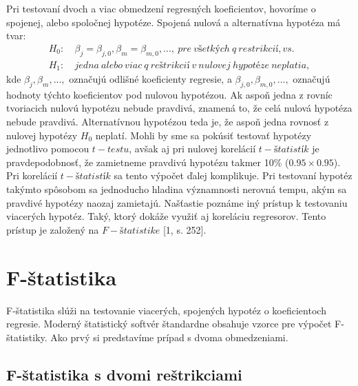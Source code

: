 \documentclass[]{tukediphc}
\begin{document}
Pri testovaní dvoch a viac obmedzení regresných koeficientov, hovoríme o spojenej, alebo spoločnej hypotéze. Spojená nulová a alternatívna hypotéza má tvar:
\begin{equation}
\begin{split}
     H_{0}: & \ \beta_j = \beta_{j,0}, \beta_m = \beta_{m,0}, ..., \ pre \ všetkých \ q \ restrikcií, vs. \ \\ H_{1}: & \ jedna \ alebo \ viac \ q \ reštrikcií \ v \ nulovej \ hypotéze \ neplatia,
\end{split}
\end{equation}
kde $\beta_j, \beta_m, ...,$ označujú odlišné koeficienty regresie, a $\beta_{j,0}, \beta_{m,0}, ...,$ označujú hodnoty týchto koeficientov pod nulovou hypotézou. Ak aspoň jedna z rovníc tvoriacich nulovú hypotézu nebude pravdivá, znamená to, že celá nulová hypotéza nebude pravdivá. Alternatívnou hypotézou teda je, že aspoň jedna rovnosť z nulovej hypotézy $H_{0}$ neplatí. 
Mohli by sme sa pokúsiť testovať hypotézy jednotlivo pomocou $t-testu$, avšak aj pri nulovej korelácií $t-štatistík$ je pravdepodobnosť, že zamietneme pravdivú hypotézu takmer 10\% ($0.95 \times 0.95$). Pri korelácií $t-štatistík$ sa tento výpočet ďalej komplikuje. Pri testovaní hypotéz takýmto spôsobom sa jednoducho hladina významnosti nerovná tempu, akým sa pravdivé hypotézy naozaj zamietajú. Našťastie poznáme iný prístup k testovaniu viacerých hypotéz. Taký, ktorý dokáže využiť aj koreláciu regresorov. Tento prístup je založený na $F-štatistike$ [1, s. 252].

\newpage
\section{F-štatistika}

F-štatistika slúži na testovanie viacerých, spojených hypotéz o koeficientoch regresie. Moderný štatistický softvér štandardne obsahuje vzorce pre výpočet F-štatistiky. Ako prvý si predstavíme prípad s dvoma obmedzeniami.

\subsection{F-štatistika s dvomi reštrikciami}
\end{document}
